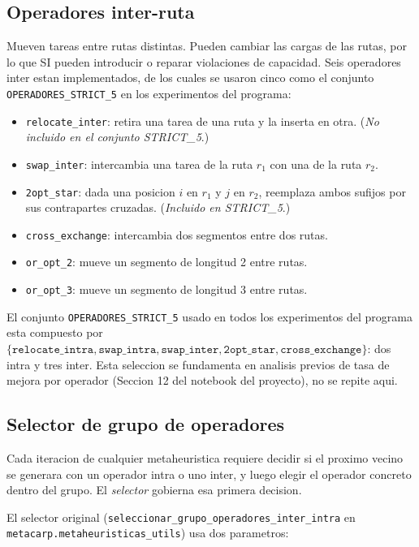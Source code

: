 \subsection{Operadores inter-ruta}

Mueven tareas entre rutas distintas. Pueden cambiar las cargas de las
rutas, por lo que SI pueden introducir o reparar violaciones de
capacidad. Seis operadores inter estan implementados, de los cuales se
usaron cinco como el conjunto \texttt{OPERADORES\_STRICT\_5} en los
experimentos del programa:

\begin{itemize}
\item \texttt{relocate\_inter}: retira una tarea de una ruta y la
  inserta en otra. (\emph{No incluido en el conjunto STRICT\_5}.)
\item \texttt{swap\_inter}: intercambia una tarea de la ruta $r_1$ con
  una de la ruta $r_2$.
\item \texttt{2opt\_star}: dada una posicion $i$ en $r_1$ y $j$ en $r_2$,
  reemplaza ambos sufijos por sus contrapartes cruzadas. (\emph{Incluido en STRICT\_5}.)
\item \texttt{cross\_exchange}: intercambia dos segmentos entre dos rutas.
\item \texttt{or\_opt\_2}: mueve un segmento de longitud 2 entre rutas.
\item \texttt{or\_opt\_3}: mueve un segmento de longitud 3 entre rutas.
\end{itemize}

El conjunto \texttt{OPERADORES\_STRICT\_5} usado en todos los
experimentos del programa esta compuesto por
$\{\texttt{relocate\_intra}, \texttt{swap\_intra},
\texttt{swap\_inter}, \texttt{2opt\_star}, \texttt{cross\_exchange}\}$:
dos intra y tres inter. Esta seleccion se fundamenta en analisis
previos de tasa de mejora por operador (Seccion 12 del notebook del
proyecto), no se repite aqui.

\subsection{Selector de grupo de operadores}
\label{sec:selector}

Cada iteracion de cualquier metaheuristica requiere decidir si el
proximo vecino se generara con un operador intra o uno inter, y luego
elegir el operador concreto dentro del grupo. El \emph{selector}
gobierna esa primera decision.

El selector original (\texttt{seleccionar\_grupo\_operadores\_inter\_intra}
en \texttt{metacarp.metaheuristicas\_utils}) usa dos parametros:

